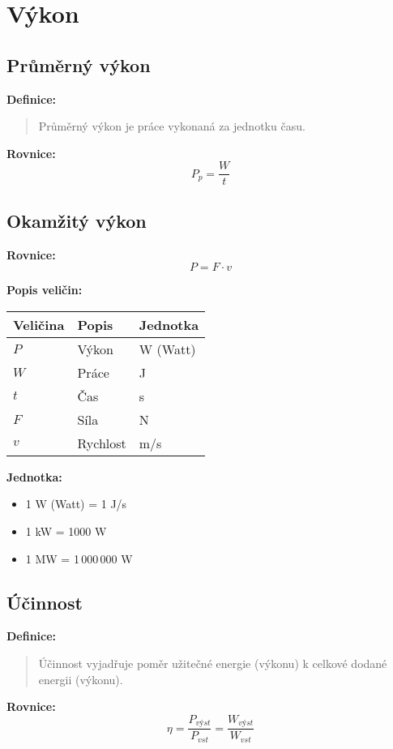 \documentclass[11pt,a4paper]{article}
\begin{document}
\clearpage

\section{Výkon}

\subsection{Průměrný výkon}

\textbf{Definice:}
\begin{quote}
Průměrný výkon je práce vykonaná za jednotku času.
\end{quote}

\textbf{Rovnice:}
\[P_p = \frac{W}{t}\]

\subsection{Okamžitý výkon}

\textbf{Rovnice:}
\[P = F \cdot v\]

\textbf{Popis veličin:}

\begin{longtable}{lll}
\toprule
Veličina & Popis & Jednotka \\
\midrule
$P$ & Výkon & W (Watt) \\
$W$ & Práce & J \\
$t$ & Čas & s \\
$F$ & Síla & N \\
$v$ & Rychlost & m/s \\
\bottomrule
\end{longtable}

\textbf{Jednotka:}
\begin{itemize}
\item 1 W (Watt) = 1 J/s
\item 1 kW = 1000 W
\item 1 MW = 1\,000\,000 W
\end{itemize}

\subsection{Účinnost}

\textbf{Definice:}
\begin{quote}
Účinnost vyjadřuje poměr užitečné energie (výkonu) k celkové dodané energii (výkonu).
\end{quote}

\textbf{Rovnice:}
\[\eta = \frac{P_{výst}}{P_{vst}} = \frac{W_{výst}}{W_{vst}}\]
\end{document}
